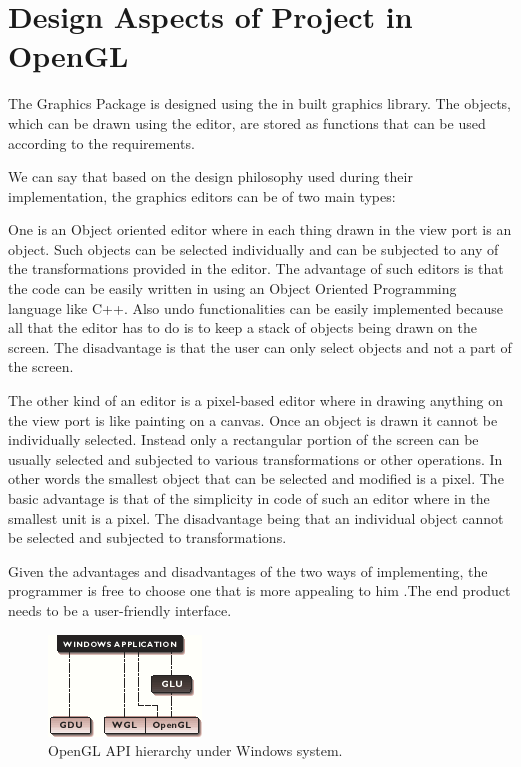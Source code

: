\documentclass[12pt]{report}
\begin{document}
\section{Design Aspects of Project in OpenGL}
The Graphics Package is designed using the in built graphics library. The objects, which can be drawn using the editor, are stored as functions that can be used according to the requirements.



We can say that based on the design philosophy used during their implementation, the graphics editors can be of two main types:



One is an Object oriented editor where in each thing drawn in the view port is an object. Such objects can be selected individually and can be subjected to any of the transformations provided in the editor. The advantage of such editors is that the code can be easily written in using an Object Oriented Programming language like C++. Also undo functionalities can be easily implemented because all that the editor has to do is to keep a stack of objects being drawn on the screen. The disadvantage is that the user can only select objects and not a part of the screen.



The other kind of an editor is a pixel-based editor where in drawing anything on the view port is like painting on a canvas. Once an object is drawn it cannot be individually selected. Instead only a rectangular portion of the screen can be usually selected and subjected to various transformations or other operations. In other words the smallest object that can be selected and modified is a pixel. The basic advantage is that of the simplicity in code of such an editor where in the smallest unit is a pixel. The disadvantage being that an individual object cannot be selected and subjected to transformations.



Given the advantages and disadvantages of the two ways of implementing, the programmer is free to choose one that is more appealing to him .The end product needs to be a user-friendly interface. 


\begin{figure}[h!]
	\centering
		\includegraphics[scale=1.0]{opengl_lib.png}
	\caption{OpenGL API hierarchy under Windows system.}
	\label{fig:logo2}
\end{figure}
\end{document}
